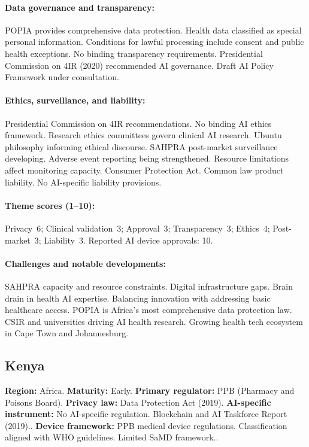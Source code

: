 {\paragraph{Data governance and transparency:}
POPIA provides comprehensive data protection. Health data classified as special personal information. Conditions for lawful processing include consent and public health exceptions.
No binding transparency requirements. Presidential Commission on 4IR (2020) recommended AI governance. Draft AI Policy Framework under consultation.

\paragraph{Ethics, surveillance, and liability:}
Presidential Commission on 4IR recommendations. No binding AI ethics framework. Research ethics committees govern clinical AI research. Ubuntu philosophy informing ethical discourse.
SAHPRA post-market surveillance developing. Adverse event reporting being strengthened. Resource limitations affect monitoring capacity.
Consumer Protection Act. Common law product liability. No AI-specific liability provisions.

\paragraph{Theme scores (1--10):}
Privacy~6;
Clinical validation~3;
Approval~3;
Transparency~3;
Ethics~4;
Post-market~3;
Liability~3.
Reported AI device approvals: 10.

\paragraph{Challenges and notable developments:}
SAHPRA capacity and resource constraints. Digital infrastructure gaps. Brain drain in health AI expertise. Balancing innovation with addressing basic healthcare access.
POPIA is Africa's most comprehensive data protection law. CSIR and universities driving AI health research. Growing health tech ecosystem in Cape Town and Johannesburg.


\subsection{Kenya}
\textbf{Region:} Africa.
\textbf{Maturity:} Early.
\textbf{Primary regulator:} PPB (Pharmacy and Poisons Board).
\textbf{Privacy law:} Data Protection Act (2019).
\textbf{AI-specific instrument:} No AI-specific regulation. Blockchain and AI Taskforce Report (2019)..
\textbf{Device framework:} PPB medical device regulations. Classification aligned with WHO guidelines. Limited SaMD framework..

}
